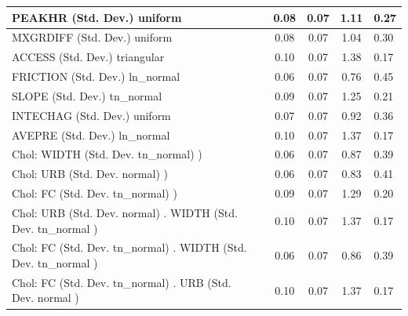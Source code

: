 \begin{table}
\begin{center}
\begin{tabular}{|l|l|c|c|c|l|}
			\hline
			PEAKHR (Std. Dev.) uniform &  & 0.08 & 0.07 & 1.11 & 0.27 \\
			\hline
			MXGRDIFF (Std. Dev.) uniform &  & 0.08 & 0.07 & 1.04 & 0.30 \\
			\hline
			ACCESS (Std. Dev.) triangular &  & 0.10 & 0.07 & 1.38 & 0.17 \\
			\hline
			FRICTION (Std. Dev.) ln_normal &  & 0.06 & 0.07 & 0.76 & 0.45 \\
			\hline
			SLOPE (Std. Dev.) tn_normal &  & 0.09 & 0.07 & 1.25 & 0.21 \\
			\hline
			INTECHAG (Std. Dev.) uniform &  & 0.07 & 0.07 & 0.92 & 0.36 \\
			\hline
			AVEPRE (Std. Dev.) ln_normal &  & 0.10 & 0.07 & 1.37 & 0.17 \\
			\hline
			 Chol: WIDTH (Std. Dev. tn_normal) ) &  & 0.06 & 0.07 & 0.87 & 0.39 \\
			\hline
			 Chol: URB (Std. Dev. normal) ) &  & 0.06 & 0.07 & 0.83 & 0.41 \\
			\hline
			 Chol: FC (Std. Dev. tn_normal) ) &  & 0.09 & 0.07 & 1.29 & 0.20 \\
			\hline
			 Chol: URB (Std. Dev. normal) . WIDTH (Std. Dev.   tn_normal ) &  & 0.10 & 0.07 & 1.37 & 0.17 \\
			\hline
			 Chol: FC (Std. Dev. tn_normal) . WIDTH (Std. Dev.   tn_normal ) &  & 0.06 & 0.07 & 0.86 & 0.39 \\
			\hline
			 Chol: FC (Std. Dev. tn_normal) . URB (Std. Dev.   normal ) &  & 0.10 & 0.07 & 1.37 & 0.17 \\
			\hline
		\end{tabular}
	\end{center}
\end{table}